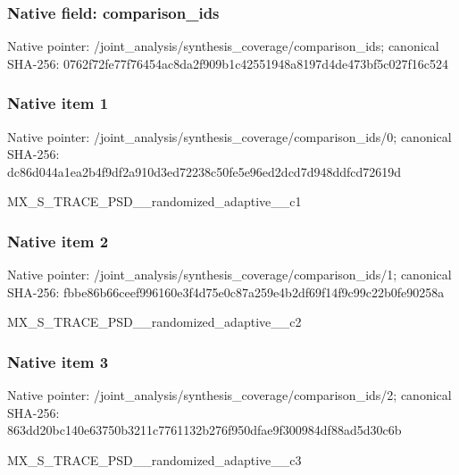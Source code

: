 \documentclass[10pt,a4paper]{article}
\begin{document}
\subsubsection{Native field: comparison\_\allowbreak{}ids}
Native pointer: /joint\_\allowbreak{}analysis/synthesis\_\allowbreak{}coverage/comparison\_\allowbreak{}ids; canonical SHA-256: 0762f72fe77f76454ac8da2f909b1c42551948a8197d4de473bf5c027f16c524

\subsubsection{Native item 1}
Native pointer: /joint\_\allowbreak{}analysis/synthesis\_\allowbreak{}coverage/comparison\_\allowbreak{}ids/0; canonical SHA-256: dc86d044a1ea2b4f9df2a910d3ed72238c50fe5e96ed2dcd7d948ddfcd72619d

\begingroup\raggedright\sloppy MX\_\allowbreak{}S\_\allowbreak{}TRACE\_\allowbreak{}PSD\_\allowbreak{}\_\allowbreak{}randomized\_\allowbreak{}adaptive\_\allowbreak{}\_\allowbreak{}c1\par\endgroup

\subsubsection{Native item 2}
Native pointer: /joint\_\allowbreak{}analysis/synthesis\_\allowbreak{}coverage/comparison\_\allowbreak{}ids/1; canonical SHA-256: fbbe86b66ceef996160e3f4d75e0c87a259e4b2df69f14f9c99c22b0fe90258a

\begingroup\raggedright\sloppy MX\_\allowbreak{}S\_\allowbreak{}TRACE\_\allowbreak{}PSD\_\allowbreak{}\_\allowbreak{}randomized\_\allowbreak{}adaptive\_\allowbreak{}\_\allowbreak{}c2\par\endgroup

\subsubsection{Native item 3}
Native pointer: /joint\_\allowbreak{}analysis/synthesis\_\allowbreak{}coverage/comparison\_\allowbreak{}ids/2; canonical SHA-256: 863dd20bc140e63750b3211c7761132b276f950dfae9f300984df88ad5d30c6b

\begingroup\raggedright\sloppy MX\_\allowbreak{}S\_\allowbreak{}TRACE\_\allowbreak{}PSD\_\allowbreak{}\_\allowbreak{}randomized\_\allowbreak{}adaptive\_\allowbreak{}\_\allowbreak{}c3\par\endgroup
\end{document}
